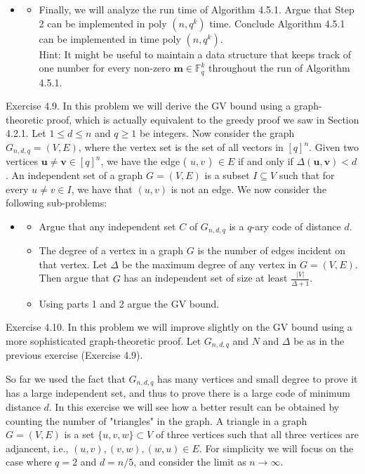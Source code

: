 \documentclass[10pt]{article}
\begin{document}
\begin{itemize}
  \item[]
  \begin{itemize}
    \item[5.] Finally, we will analyze the run time of Algorithm 4.5.1. Argue that Step 2 can be implemented in poly $\left(n, q^{k}\right)$ time. Conclude Algorithm 4.5.1 can be implemented in time poly $\left(n, q^{k}\right)$.\\
Hint: It might be useful to maintain a data structure that keeps track of one number for every non-zero $\mathbf{m} \in \mathbb{F}_{q}^{k}$ throughout the run of Algorithm 4.5.1.
  \end{itemize}
\end{itemize}

Exercise 4.9. In this problem we will derive the GV bound using a graph-theoretic proof, which is actually equivalent to the greedy proof we saw in Section 4.2.1. Let $1 \leq d \leq n$ and $q \geq 1$ be integers. Now consider the graph $G_{n, d, q}=(V, E)$, where the vertex set is the set of all vectors in $[q]^{n}$. Given two vertices $\mathbf{u} \neq \mathbf{v} \in[q]^{n}$, we have the edge ( $u, v$ ) $\in E$ if and only if $\Delta(\mathbf{u}, \mathbf{v})<d$. An independent set of a graph $G=(V, E)$ is a subset $I \subseteq V$ such that for every $u \neq v \in I$, we have that $(u, v)$ is not an edge. We now consider the following sub-problems:

\begin{itemize}
  \item[]
  \begin{itemize}
    \item[1.] Argue that any independent set $C$ of $G_{n, d, q}$ is a $q$-ary code of distance $d$.
    \item[2.] The degree of a vertex in a graph $G$ is the number of edges incident on that vertex. Let $\Delta$ be the maximum degree of any vertex in $G=(V, E)$. Then argue that $G$ has an independent set of size at least $\frac{|V|}{\Delta+1}$.
    \item[3.] Using parts 1 and 2 argue the GV bound.
  \end{itemize}
\end{itemize}

Exercise 4.10. In this problem we will improve slightly on the GV bound using a more sophisticated graph-theoretic proof. Let $G_{n, d, q}$ and $N$ and $\Delta$ be as in the previous exercise (Exercise 4.9).

So far we used the fact that $G_{n, d, q}$ has many vertices and small degree to prove it has a large independent set, and thus to prove there is a large code of minimum distance $d$. In this exercise we will see how a better result can be obtained by counting the number of "triangles" in the graph. A triangle in a graph $G=(V, E)$ is a set $\{u, v, w\} \subset V$ of three vertices such that all three vertices are adjancent, i.e., $(u, v),(v, w),(w, u) \in E$. For simplicity we will focus on the case where $q=2$ and $d=n / 5$, and consider the limit as $n \rightarrow \infty$.
\end{document}
